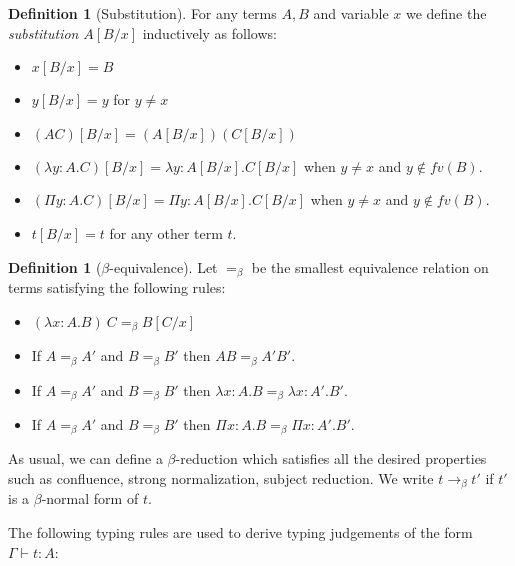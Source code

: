 \documentclass[11pt]{article}
\theoremstyle{definition}
\theoremstyle{definition}
\theoremstyle{definition}
\theoremstyle{definition}
\theoremstyle{definition}
\newtheorem{definition}[theorem]{Definition}
\theoremstyle{definition}
\theoremstyle{definition}
\newcommand{\fv}{\mathit{fv}}
\begin{document}
	\begin{definition}[Substitution]
		For any terms $A, B$ and variable $x$ we define the \emph{substitution} $A[B/x]$ inductively as follows:
		\begin{itemize}
			\item $x[B/x] = B$
			\item $y[B/x] = y$ for $y \neq x$
			\item $(A C)[B/x] = (A[B/x])(C[B/x])$
			\item $(\lambda y: A. C)[B/x] = \lambda y: A[B/x]. C[B/x]$ when $y\neq x$ and $y\notin\fv(B)$.
			\item $(\Pi y: A. C)[B/x] = \Pi y: A[B/x]. C[B/x]$ when $y\neq x$ and $y\notin\fv(B)$.
			\item $t[B/x] = t$ for any other term $t$.
		\end{itemize}
	\end{definition}
	
	\begin{definition}[$\beta$-equivalence]
		Let $=_\beta$ be the smallest equivalence relation on terms satisfying the following rules:
		\begin{itemize}
			\item $(\lambda x: A. B)\ C =_\beta B[C/x]$
			\item If $A =_\beta A'$ and $B =_\beta B'$ then $A B =_\beta A' B'$.
			\item If $A =_\beta A'$ and $B =_\beta B'$ then $\lambda x: A. B =_\beta \lambda x: A'. B'$.
			\item If $A =_\beta A'$ and $B =_\beta B'$ then $\Pi x: A. B =_\beta \Pi x: A'. B'$.
		\end{itemize}
	\end{definition}
	As usual, we can define a $\beta$-reduction which satisfies all the desired properties such as confluence, strong normalization, subject reduction. We write $t\to_\beta t'$ if $t'$ is a $\beta$-normal form of $t$.

	The following typing rules are used to derive typing judgements of the form $\Gamma\vdash t: A$:
\end{document}

